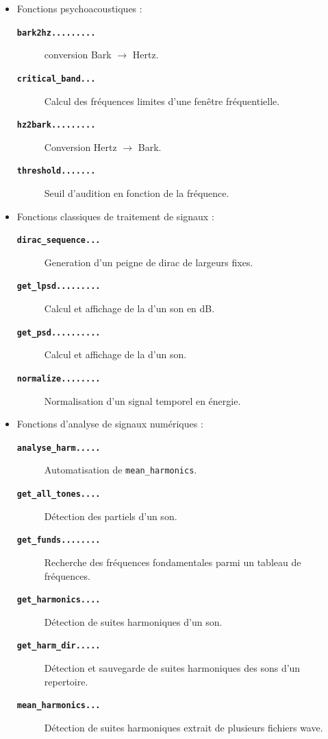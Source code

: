 \begin{itemize}
\bigskip
\item Fonctions psychoacoustiques :
    \begin{description}
        \item[\textbf{\tt bark2hz.........}]conversion Bark $\rightarrow$ Hertz.
        \item[\textbf{\tt critical\_band...}]Calcul des fr{\'e}quences limites d'une fen{\^e}tre fr{\'e}quentielle.
        \item[\textbf{\tt hz2bark.........}]Conversion Hertz $\rightarrow$ Bark.
        \item[\textbf{\tt threshold.......}]Seuil d'audition en fonction de la fr{\'e}quence.
    \end{description}

\bigskip
\item Fonctions classiques de traitement de signaux :
    \begin{description}
        \item[\textbf{\tt dirac\_sequence...}]Generation d'un peigne de dirac de largeurs fixes.
        \item[\textbf{\tt get\_lpsd.........}]Calcul et affichage de la \dsp d'un son en dB.
        \item[\textbf{\tt get\_psd..........}]Calcul et affichage de la \dsp d'un son.
        \item[\textbf{\tt normalize........}]Normalisation d'un signal temporel en {\'e}nergie.
    \end{description}

\bigskip
\item Fonctions d'analyse de signaux num{\'e}riques :
    \begin{description}
        \item[\textbf{\tt analyse\_harm.....}]Automatisation de {\tt mean\_harmonics}.
        \item[\textbf{\tt get\_all\_tones....}]D{\'e}tection des partiels d'un son.
        \item[\textbf{\tt get\_funds........}]Recherche des fr{\'e}quences fondamentales parmi un tableau de fr{\'e}quences.
        \item[\textbf{\tt get\_harmonics....}]D{\'e}tection de suites harmoniques d'un son.
        \item[\textbf{\tt get\_harm\_dir.....}]D{\'e}tection et sauvegarde de suites harmoniques des sons d'un repertoire.
        \item[\textbf{\tt mean\_harmonics...}]D{\'e}tection de suites harmoniques extrait de plusieurs fichiers wave.
    \end{description}


\end{itemize}
